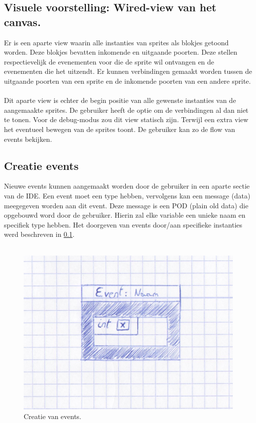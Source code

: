 \documentclass[]{article}
\begin{document}
\subsection{Visuele voorstelling: Wired-view van het canvas.}
\label{Visuele voorstelling: Wired-view van het canvas.}
Er is een aparte view waarin alle instanties van sprites als blokjes getoond worden. Deze blokjes bevatten inkomende en uitgaande poorten. Deze stellen respectievelijk de evenementen voor die de sprite wil ontvangen en de evenementen die het uitzendt. Er kunnen verbindingen gemaakt worden tussen de uitgaande poorten van een sprite en de inkomende poorten van een andere sprite.\\\\ 
Dit aparte view is echter de begin positie van alle gewenste instanties van de aangemaakte sprites. De gebruiker heeft de optie om de verbindingen al dan niet te tonen. Voor de debug-modus zou dit view statisch zijn. Terwijl een extra view het eventueel bewegen van de sprites toont. De gebruiker kan zo de flow van events bekijken.

\subsection{Creatie events}
Nieuwe events kunnen aangemaakt worden door de gebruiker in een aparte sectie van de IDE. Een event moet een type hebben, vervolgens kan een message (data) meegegeven worden aan dit event. Deze message is een POD (plain old data) die opgebouwd word door de gebruiker. Hierin zal elke variable een unieke naam en specifiek type hebben. Het doorgeven van events door/aan specifieke instanties werd beschreven in \ref{Visuele voorstelling: Wired-view van het canvas.}. \\\\ 
\begin{figure}
  \centering
\includegraphics[scale=0.20]{mockups/eventcreatie.jpg}
  \caption{Creatie van events.} \label{eventcreatie}
\end{figure}
\end{document}
